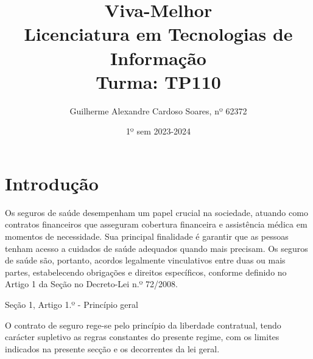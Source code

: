 \documentclass{report}
\begin{document}
\title{Viva-Melhor\\Licenciatura em Tecnologias de Informação \\ Turma: TP110}
\author{Guilherme Alexandre Cardoso Soares, nº 62372}
\date{1º sem 2023-2024}
\maketitle

\tableofcontents
\setcounter{page}{1}

\listoftables
\listoffigures

\newpage
{}
\setcounter{page}{4}

\chapter{Introdução}

Os seguros de saúde desempenham um papel crucial na sociedade, atuando como contratos financeiros que asseguram cobertura financeira e assistência médica em momentos de necessidade. Sua principal finalidade é garantir que as pessoas tenham acesso a cuidados de saúde adequados quando mais precisam. Os seguros de saúde são, portanto, acordos legalmente vinculativos entre duas ou mais partes, estabelecendo obrigações e direitos específicos, conforme definido no Artigo 1 da Seção no Decreto-Lei n.º 72/2008.

\begin{quoting}
  Seção 1, Artigo 1.º - Princípio geral

  O contrato de seguro rege-se pelo princípio da liberdade contratual, tendo carácter supletivo as regras constantes do presente regime, com os limites indicados na presente secção e os decorrentes da lei geral.
\end{quoting}
\end{document}
